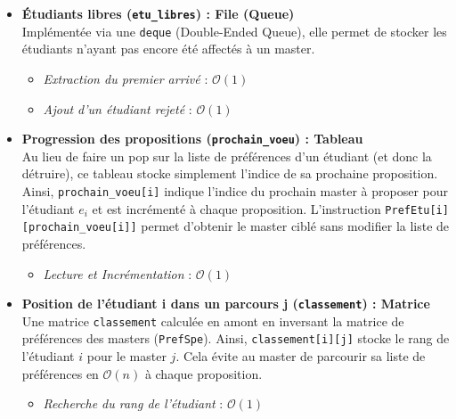 \documentclass{article}
\begin{document}
\begin{itemize}
    \item \textbf{Étudiants libres (\texttt{etu\_libres}) : File (Queue)} \\
    Implémentée via une \texttt{deque} (Double-Ended Queue), elle permet de stocker les étudiants n'ayant pas encore été affectés à un master. 
    \begin{itemize}
        \item \textit{Extraction du premier arrivé} : $\mathcal{O}(1)$
        \item \textit{Ajout d'un étudiant rejeté} : $\mathcal{O}(1)$
    \end{itemize}

    \item \textbf{Progression des propositions (\texttt{prochain\_voeu}) : Tableau} \\
    Au lieu de faire un pop sur la liste de préférences d'un étudiant (et donc la détruire), ce tableau stocke simplement l'indice de sa prochaine proposition.
    Ainsi, \texttt{prochain\_voeu[i]} indique l'indice du prochain master à proposer pour l'étudiant $e_i$ et est incrémenté à chaque proposition. 
    L'instruction \texttt{PrefEtu[i][prochain\_voeu[i]]} permet d'obtenir le master ciblé sans modifier la liste de préférences.

    \begin{itemize}
        \item \textit{Lecture et Incrémentation} : $\mathcal{O}(1)$
    \end{itemize}

    \item \textbf{Position de l'étudiant i dans un parcours j (\texttt{classement}) : Matrice} \\
    Une matrice \texttt{classement} calculée en amont en inversant la matrice de préférences des masters (\texttt{PrefSpe}). Ainsi, \texttt{classement[i][j]} stocke le rang de l'étudiant $i$ pour le master $j$. Cela évite au master de parcourir sa liste de préférences en $\mathcal{O}(n)$ à chaque proposition.
    \begin{itemize}
        \item \textit{Recherche du rang de l'étudiant} : $\mathcal{O}(1)$
    \end{itemize}


\end{itemize}
\end{document}
